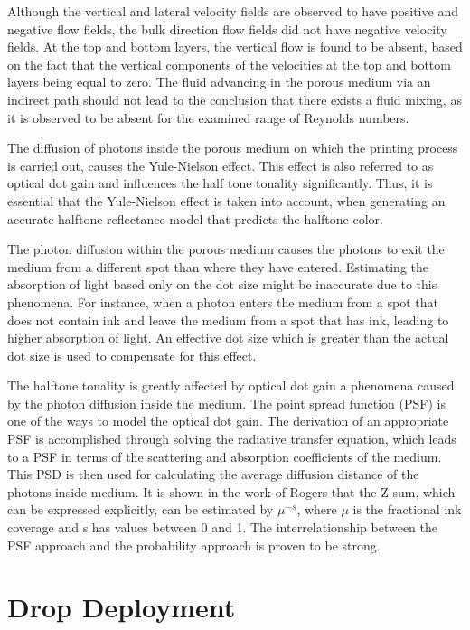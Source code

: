 Although the vertical and lateral velocity fields are observed  to have positive and negative  flow fields, the bulk direction flow fields did not have negative velocity fields. At the top and bottom layers, the vertical flow is found to be absent, based on the fact that the vertical components of the velocities at the top and bottom layers being equal to zero. The fluid advancing in the porous medium via an indirect path should not lead to the  conclusion that there exists a fluid mixing, as it is observed to be absent for the examined range of Reynolds numbers.\citep{hapgood2002drop}

The diffusion of photons inside the porous medium on which the printing process is carried out, causes the Yule-Nielson effect. This effect is also referred to as optical dot gain and influences the half tone tonality significantly. Thus, it is essential that the Yule-Nielson effect is taken into account, when generating an accurate halftone reflectance model that predicts the halftone color.

The photon diffusion within the porous medium causes the photons to exit the medium from a different spot than  where they  have entered. Estimating the absorption of light based only on the dot size might be inaccurate due to this phenomena. For instance, when a photon enters the medium from a spot that does  not contain ink and leave the medium from a spot that has ink, leading to higher absorption of light.
An effective dot size which is greater than the actual dot size is used to compensate for this effect.

The halftone tonality is greatly affected by optical dot gain a phenomena caused by the photon diffusion inside the medium. The point spread function (PSF) is one of the ways to model the optical dot gain. The derivation of an appropriate PSF is accomplished through solving the radiative transfer equation, which leads to a PSF in terms of the scattering and absorption coefficients of the medium. This PSD is then used for calculating the average diffusion distance of the photons inside medium. It is shown in the work of Rogers that the Z-sum, which can be expressed explicitly, can be estimated by $\mu^{-s}$, where $\mu$ is the fractional ink coverage and s has values between 0 and 1.  The interrelationship  between the PSF  approach and the probability approach is proven to be strong. \citep{rogers2015point}
\section{Drop Deployment}

